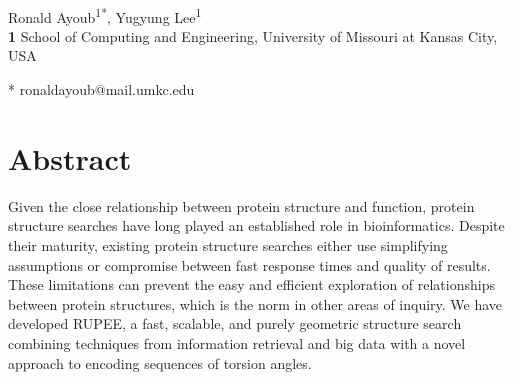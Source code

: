 \documentclass[10pt,letterpaper]{article}
\begin{document}
\vspace*{0.2in}

\begin{flushleft}
{\Large
\textbf{} %
}
\newline
\\
Ronald Ayoub\textsuperscript{1*},
Yugyung Lee\textsuperscript{1}
\\
\bigskip
\textbf{1} School of Computing and Engineering, University of Missouri at Kansas City, USA
\\
\bigskip

% 
%





* ronaldayoub@mail.umkc.edu

\end{flushleft}
\section*{Abstract}
Given the close relationship between protein structure and function, protein structure searches have long played an established role in bioinformatics. 
Despite their maturity, existing protein structure searches either use simplifying assumptions or compromise between fast response times and quality of results. 
These limitations can prevent the easy and efficient exploration of relationships between protein structures, which is the norm in other areas of inquiry.
We have developed RUPEE, a fast, scalable, and purely geometric structure search combining techniques from information retrieval and big data with a novel approach to encoding sequences of torsion angles.
    
\end{document}
